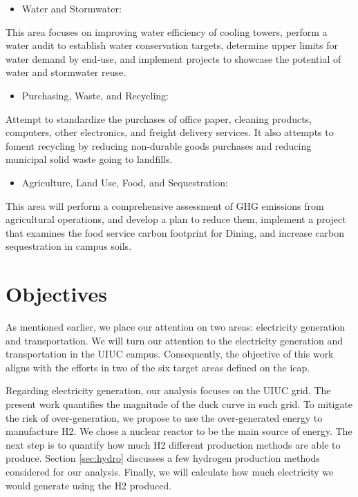 \documentclass[11pt,letterpaper]{article}
\begin{document}
\begin{itemize}
	\item Water and Stormwater:
\end{itemize}
This area focuses on improving water efficiency of cooling towers, perform a water audit to establish water conservation targets, determine upper limits for water demand by end-use, and implement projects to showcase the potential of water and stormwater reuse.

\begin{itemize}
	\item Purchasing, Waste, and Recycling:
\end{itemize}
Attempt to standardize the purchases of office paper, cleaning products, computers, other electronics, and freight delivery services.
It also attempts to foment recycling by reducing non-durable goods purchases and reducing municipal solid waste going to landfills.

\begin{itemize}
	\item Agriculture, Land Use, Food, and Sequestration:
\end{itemize}
This area will perform a comprehensive assessment of \gls{GHG} emissions from agricultural operations, and develop a plan to reduce them, implement a project that examines the food service carbon footprint for Dining, and increase carbon sequestration in campus soils.

\section{Objectives}

As mentioned earlier, we place our attention on two areas: electricity generation and transportation.
We will turn our attention to the electricity generation and transportation in the \gls{UIUC} campus.
Consequently, the objective of this work aligns with the efforts in two of the six target areas defined on the \gls{icap}.

Regarding electricity generation, our analysis focuses on the \gls{UIUC} grid.
The present work quantifies the magnitude of the duck curve in such grid.
To mitigate the risk of over-generation, we propose to use the over-generated energy to manufacture \gls{H2}.
We chose a nuclear reactor to be the main source of energy.
The next step is to quantify how much \gls{H2} different production methods are able to produce.
Section \ref{sec:hydro} discusses a few hydrogen production methods considered for our analysis.
Finally, we will calculate how much electricity we would generate using the \gls{H2} produced.
\end{document}
